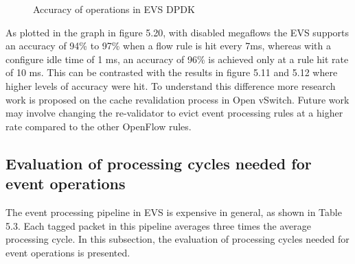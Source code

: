 \begin{figure}[H]
 \noindent\hrulefill
 
 \noindent
 \caption{Accuracy of  operations in EVS DPDK}
 \hfil
\end{figure}


As plotted in the graph in figure 5.20, with disabled megaflows the EVS supports an accuracy of 94\% to 97\% when a flow rule is hit every 7ms, whereas with a configure idle time of 1 ms, an accuracy of 96\% is achieved only at a rule hit rate of 10 ms. This can be contrasted with the results in figure 5.11 and 5.12 where higher levels of accuracy were hit. To understand this difference more research work is proposed on the cache revalidation process in Open vSwitch. Future work may involve changing the re-validator to evict event processing rules at a higher rate compared to the other OpenFlow rules.


\subsection{Evaluation of processing cycles needed for event operations}
 The event processing pipeline in EVS is expensive in general, as shown in Table 5.3. Each tagged packet in this pipeline averages three times the average processing cycle. In this subsection, the evaluation of processing cycles needed for event operations is presented.
 

